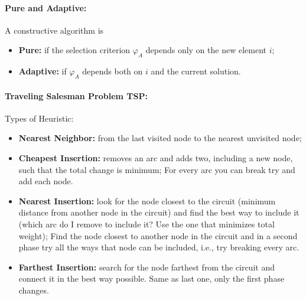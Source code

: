 \documentclass{article}
\begin{document}
	\paragraph{Pure and Adaptive:} A constructive algorithm is 
	\begin{itemize}
		\item \textbf{Pure:} if the selection criterion $\varphi_A$ depends only on the new element $i$;
		\item \textbf{Adaptive:} if $\varphi_A$ depends both on $i$ and the current solution.\\
	\end{itemize}
	
	\paragraph{Traveling Salesman Problem TSP:} Types of Heuristic: 
	\begin{itemize}
		\item \textbf{Nearest Neighbor:} from the last visited node to the nearest unvisited node;
		\item \textbf{Cheapest Insertion:} removes an arc and adds two, including a new node, such that the total change is minimum; For every arc you can break try and add each node.
		\item \textbf{Nearest Insertion:} look for the node closest to the circuit (minimum distance from another node in the circuit) and find the best way to include it (which arc do I remove to include it? Use the one that minimizes total weight); Find the node closest to another node in the circuit and in a second phase try all the ways that node can be included, i.e., try breaking every arc.
		\item \textbf{Farthest Insertion:} search for the node farthest from the circuit and connect it in the best way possible. Same as last one, only the first phase changes.\\
	\end{itemize}
	
\end{document}

